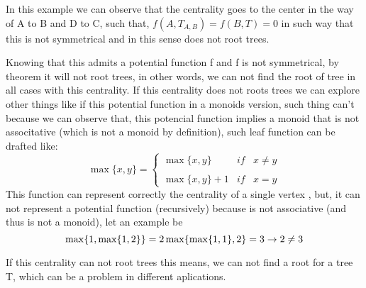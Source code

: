 In this example we can observe that the centrality goes to the center in the way of A to B and D to C, such that, $f(A,T_{A,B}) =  f(B,T) = 0$ in such way that this is not symmetrical and in this sense does not root trees.

Knowing that this admits a potential function f and f is not symmetrical, by theorem it will not root trees, in other words, we can not find the root of tree in all cases with this centrality. If this centrality does not roots trees we can explore other things like if this potential function in a monoids version, such thing can't because we can observe that, this potencial function implies a monoid that is not associtative (which is not a monoid by definition), such leaf function can be drafted like:
\begin{equation}
    \max\{ x,y \}= \left\{ \begin{array}{lcc}
              \max\{x,y \} &   if  & x \neq y \\
             \\ \max\{ x,y \} + 1 & if  & x = y 
             \end{array}
   \right.
\end{equation}
This function can represent correctly the centrality of a single vertex , but, it can not represent a potential function (recursively) because is not associative (and thus is not a monoid), let an example be
\begin{equation}
    \max\{ 1,\max\{ 1,2 \} \} = 2 \\
    \vspace{0.5cm}
    \max\{ \max\{ 1,1 \},2 \}  = 3 \\
    \vspace{0.5cm}
    \rightarrow 2 \neq 3
\end{equation}

If this centrality can not root trees this means, we can not find a root for a tree T, which can be a problem in different aplications.


